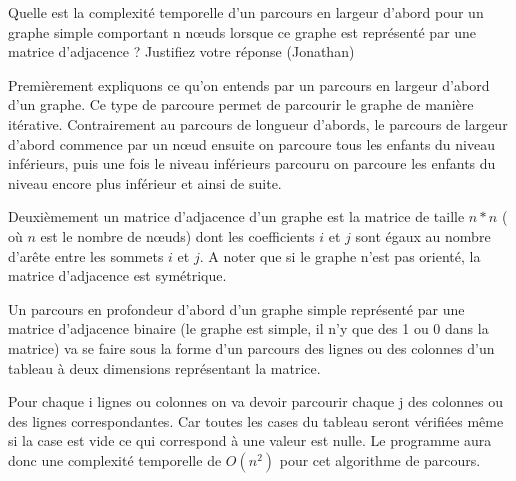 Quelle est la complexité temporelle d'un parcours en largeur d'abord pour un
graphe simple comportant n nœuds lorsque ce graphe est représenté par une matrice
d'adjacence ? Justifiez votre réponse 
(Jonathan)

Premièrement expliquons ce qu'on entends par un parcours en largeur d'abord d'un graphe. Ce type de parcoure permet de parcourir le graphe de manière itérative. Contrairement au parcours de longueur d'abords, le parcours de largeur d'abord commence par un nœud ensuite on parcoure tous les enfants du niveau inférieurs, puis une fois le niveau inférieurs parcouru on parcoure les enfants du niveau encore plus inférieur et ainsi de suite.

Deuxièmement un matrice d'adjacence d'un graphe est la matrice de taille $n * n$ ( où $n$ est le nombre de nœuds) dont les coefficients $i$ et $j$ sont égaux au nombre d'arête entre les sommets $i$ et $j$. A noter que si le graphe n'est pas orienté, la matrice d'adjacence est symétrique.

Un parcours en profondeur d'abord d'un graphe simple représenté par une matrice d'adjacence binaire (le graphe est simple, il n'y que des 1 ou 0 dans la matrice) va se faire sous la forme d'un parcours des lignes ou des colonnes d'un tableau à deux dimensions représentant la matrice.

Pour chaque i lignes ou colonnes on va devoir parcourir chaque j des colonnes ou des lignes correspondantes. Car toutes les cases du tableau seront vérifiées même si la case est vide ce qui correspond à une valeur est nulle. Le programme aura donc une complexité temporelle de $O(n^2)$ pour cet algorithme de parcours.